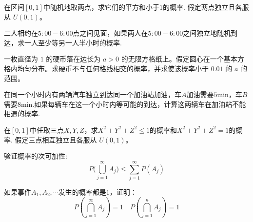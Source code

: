 \begin{exercise}[单位正方形中的圆域]\label{q:Y1.11}
在区间$[0,1]$中随机地取两点，求它们的平方和小于$1$的概率. 假定两点独立且各服从 $U(0,1)$。\par{}\end{exercise}

\begin{exercise}[到达时差与等待]\label{q:Y1.12}
二人相约在$5:00-6:00$点之间见面，如果两人在$5:00-6:00$之间独立地随机到达，求一人至少等另一人半小时的概率.\par{}\end{exercise}

\begin{exercise}[硬币落格与边界区域]\label{q:Y1.13}
一枚直径为 $1$ 的硬币落在边长为 $a>0$ 的无限方格纸上。假定圆心在一个基本方格内均匀分布。求硬币不与任何格线相交的概率，并求使该概率小于 $0.01$ 的 $a$ 的范围。\par{}\end{exercise}

\begin{exercise}[两次服务是否相遇]\label{q:Y1.14}
在同一个小时内有两辆汽车独立到达同一个加油站加油，车$A$加油需要$5$min，车$B$需要$8$min.如果每辆车在这一个小时内等可能的到达，计算这两辆车在加油站不能相遇的概率.\par{}\end{exercise}

\begin{exercise}[立方体内的球域]\label{q:Y1.15}
在$[0,1]$中任取三点$X,Y,Z$，求$X^2+Y^2+Z^2\leqslant 1$的概率和$X^2+Y^2+Z^2=1$的概率. 假定三点相互独立且各服从 $U(0,1)$。\par{}\end{exercise}

\begin{exercise}[概率的次可加性]\label{q:Y1.17}
验证概率的次可加性:
\[P(\bigcup\limits_{j = 1}^\infty  {{A_j}) \leqslant } \sum\limits_{j = 1}^\infty  {P({A_j})} \]\par{}\end{exercise}

\begin{exercise}[可数个概率一事件]\label{q:Y1.18}
如果事件$A_1,A_2,\cdots$发生的概率都是$1$，证明：
\[P(\bigcap\limits_{j = 1}^\infty  {{A_j}} ) = 1\quad P(\bigcap\limits_{j = 1}^n {{A_j}} ) = 1\]\par{}\end{exercise}

